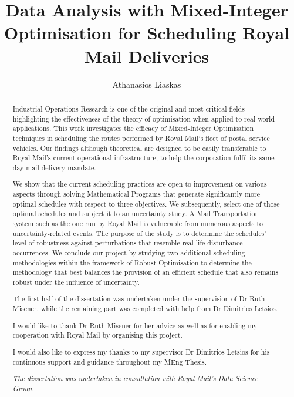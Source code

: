 \documentclass[a4paper, twoside]{report}
\title{Data Analysis with Mixed-Integer Optimisation for Scheduling Royal Mail Deliveries}
\author{Athanasios Liaskas}
\begin{document}


\begin{abstract}
Industrial Operations Research is one of the original and most critical fields highlighting the effectiveness of the theory of optimisation when applied to real-world applications. This work investigates the efficacy of Mixed-Integer Optimisation techniques in scheduling the routes performed by Royal Mail's fleet of postal service vehicles. Our findings although theoretical are designed to be easily transferable to Royal Mail's current operational infrastructure, to help the corporation fulfil its same-day mail delivery mandate. 

\vspace{\baselineskip}
\noindent
We show that the current scheduling practices are open to improvement on various aspects through solving Mathematical Programs that generate significantly more optimal schedules with respect to three objectives. We subsequently, select one of those optimal schedules and subject it to an uncertainty study. A Mail Transportation system such as the one run by Royal Mail is vulnerable from numerous aspects to uncertainty-related events. The purpose of the study is to determine the schedules' level of robustness against perturbations that resemble real-life disturbance occurrences. We conclude our project by studying two additional scheduling methodologies within the framework of Robust Optimisation to determine the methodology that best balances the provision of an efficient schedule that also remains robust under the influence of uncertainty.
\end{abstract}

\renewcommand{\abstractname}{Acknowledgements}
\begin{abstract}
The first half of the dissertation was undertaken under the supervision of Dr Ruth Misener, while the remaining part was completed with help from Dr Dimitrios Letsios.

\vspace{\baselineskip}
\noindent
I would like to thank Dr Ruth Misener for her advice as well as for enabling my cooperation with Royal Mail by organising this project. 

\vspace{\baselineskip}
\noindent
I would also like to express my thanks to my supervisor Dr Dimitrios Letsios for his continuous support and guidance throughout my MEng Thesis.

\vspace{\baselineskip}
\noindent
\vspace{\baselineskip}
\noindent
\textit{The dissertation was undertaken in consultation with Royal Mail's Data Science Group.}
\end{abstract}
\end{document}
